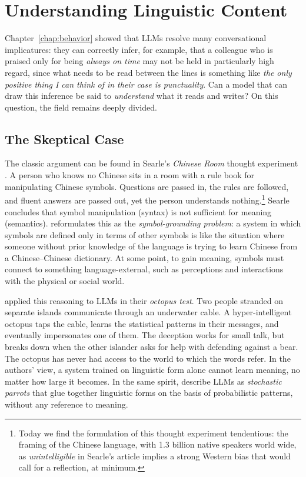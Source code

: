 \section{Understanding Linguistic Content}\label{sec:understanding}
Chapter~\ref{chap:behavior} showed that LLMs resolve many conversational implicatures: they can correctly infer, for example, that a colleague who is praised only for being {\em always on time} may not be held in particularly high regard, since what needs to be read between the lines is something like \emph{the only positive thing I can think of in their case is punctuality}. Can a model that can draw this inference be said to \emph{understand} what it reads and writes? On this question, the field remains deeply divided.

\subsection{The Skeptical Case}
The classic argument can be found in Searle's \emph{Chinese Room} thought experiment \citep{searle1980minds}. A person who knows no Chinese sits in a room with a rule book for manipulating Chinese symbols. Questions are passed in, the rules are followed, and fluent answers are passed out, yet the person understands nothing.\footnote{Today we find the formulation of this thought experiment tendentious: the framing of the Chinese language, with 1.3 billion native speakers world wide, as \emph{unintelligible} in Searle's article implies a strong Western bias that would call for a reflection, at minimum.} Searle concludes that symbol manipulation (syntax) is not sufficient for meaning (semantics). \citet{harnard1990symbol} reformulates this as the \emph{symbol-grounding problem}: a system in which symbols are defined only in terms of other symbols is like the situation where someone without prior knowledge of the language is trying to learn Chinese from a Chinese--Chinese dictionary. At some point, to gain meaning, symbols must connect to something language-external, such as perceptions and interactions with the physical or social world.

\citet{bender-koller2020climbing} applied this reasoning to LLMs in their \emph{octopus test}. Two people stranded on separate islands communicate through an underwater cable. A hyper-intelligent octopus taps the cable, learns the statistical patterns in their messages, and eventually impersonates one of them. The deception works for small talk, but breaks down when the other islander asks for help with defending against a bear. The octopus has never had access to the world to which the words refer. In the authors' view, a system trained on linguistic form alone cannot learn meaning, no matter how large it becomes. In the same spirit, \citet{bender2021dangers} describe LLMs as \emph{stochastic parrots} that glue together linguistic forms on the basis of probabilistic patterns, without any reference to meaning.

